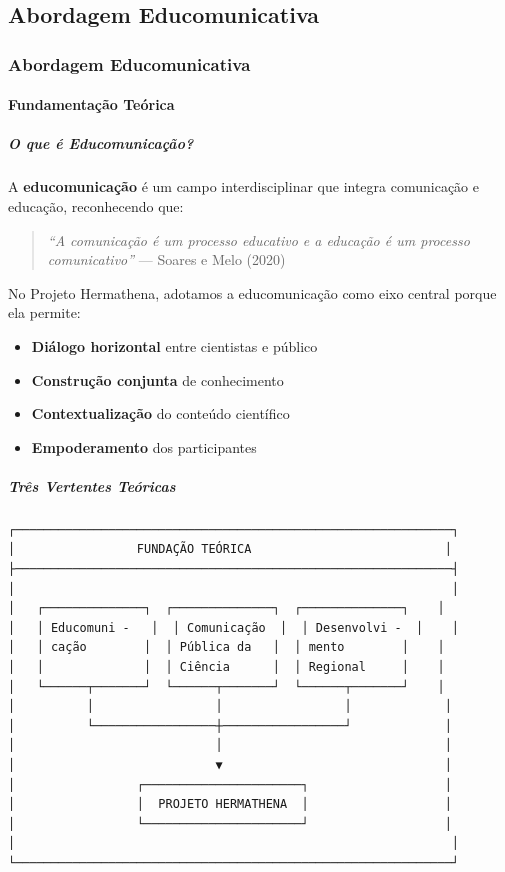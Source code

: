 \subsection{Abordagem Educomunicativa}

\subsubsection{Abordagem Educomunicativa}

\paragraph{Fundamentação Teórica}

\subparagraph{O que é Educomunicação?}

A \textbf{educomunicação} é um campo interdisciplinar que integra comunicação e educação, reconhecendo que:

\begin{quote}
\textit{``A comunicação é um processo educativo e a educação é um processo comunicativo''} --- Soares e Melo (2020)
\end{quote}

No Projeto Hermathena, adotamos a educomunicação como eixo central porque ela permite:

\begin{itemize}
\item \textbf{Diálogo horizontal} entre cientistas e público
\item \textbf{Construção conjunta} de conhecimento
\item \textbf{Contextualização} do conteúdo científico
\item \textbf{Empoderamento} dos participantes
\end{itemize}

\subparagraph{Três Vertentes Teóricas}

\begin{verbatim}
┌─────────────────────────────────────────────────────────────┐
│                 FUNDAÇÃO TEÓRICA                           │
├─────────────────────────────────────────────────────────────┤
│                                                             │
│   ┌──────────────┐  ┌──────────────┐  ┌──────────────┐    │
│   │ Educomuni -   │  │ Comunicação  │  │ Desenvolvi -  │    │
│   │ cação        │  │ Pública da   │  │ mento        │    │
│   │              │  │ Ciência      │  │ Regional     │    │
│   └──────┬───────┘  └──────┬───────┘  └──────┬───────┘    │
│          │                 │                 │             │
│          └─────────────────┼─────────────────┘             │
│                            │                               │
│                            ▼                               │
│                 ┌──────────────────────┐                   │
│                 │  PROJETO HERMATHENA  │                   │
│                 └──────────────────────┘                   │
│                                                             │
└─────────────────────────────────────────────────────────────┘
\end{verbatim}


